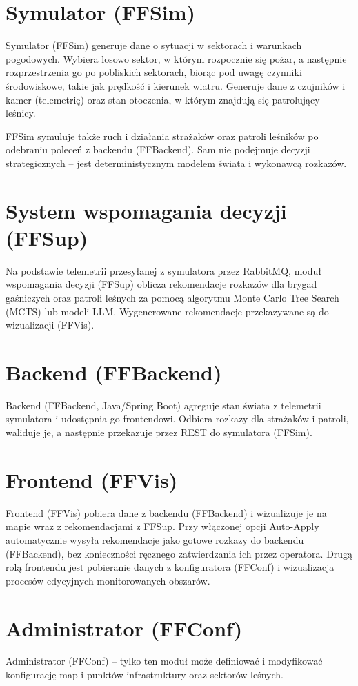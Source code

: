 \section*{Symulator (FFSim)}
Symulator (FFSim) generuje dane o sytuacji w sektorach i warunkach pogodowych. Wybiera losowo sektor, w którym rozpocznie się pożar, a następnie rozprzestrzenia go po pobliskich sektorach, biorąc pod uwagę czynniki środowiskowe, takie jak prędkość i kierunek wiatru. Generuje dane z czujników i kamer (telemetrię) oraz stan otoczenia, w którym znajdują się patrolujący leśnicy.

FFSim symuluje także ruch i działania strażaków oraz patroli leśników po odebraniu poleceń z backendu (FFBackend). Sam nie podejmuje decyzji strategicznych -- jest deterministycznym modelem świata i wykonawcą rozkazów.

\section*{System wspomagania decyzji (FFSup)}
Na podstawie telemetrii przesyłanej z symulatora przez RabbitMQ, moduł wspomagania decyzji (FFSup) oblicza rekomendacje rozkazów dla brygad gaśniczych oraz patroli leśnych za pomocą algorytmu Monte Carlo Tree Search (MCTS) lub modeli LLM. Wygenerowane rekomendacje przekazywane są do wizualizacji (FFVis).

\section*{Backend (FFBackend)}
Backend (FFBackend, Java/Spring Boot) agreguje stan świata z telemetrii symulatora i udostępnia go frontendowi. Odbiera rozkazy dla strażaków i patroli, waliduje je, a następnie przekazuje przez REST do symulatora (FFSim).

\section*{Frontend (FFVis)}
Frontend (FFVis) pobiera dane z backendu (FFBackend) i wizualizuje je na mapie wraz z rekomendacjami z FFSup. Przy włączonej opcji Auto-Apply automatycznie wysyła rekomendacje jako gotowe rozkazy do backendu (FFBackend), bez konieczności ręcznego zatwierdzania ich przez operatora. Drugą rolą frontendu jest pobieranie danych z konfiguratora (FFConf) i wizualizacja procesów edycyjnych monitorowanych obszarów.

\section*{Administrator (FFConf)}
Administrator (FFConf) – tylko ten moduł może definiować i modyfikować konfigurację map i punktów infrastruktury oraz sektorów leśnych.  

